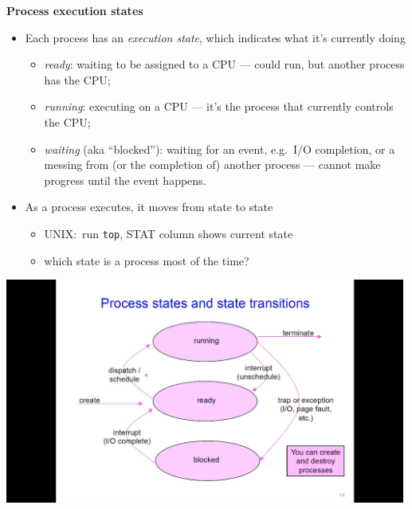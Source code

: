 \documentclass[11pt,a4paper]{article}
\begin{document}
\textbf{Process execution states}
\begin{itemize}
    \item Each process has an \emph{execution state}, which indicates what it's currently doing
        \begin{itemize}
            \item \emph{ready}: waiting to be assigned to a CPU ---
                could run, but another process has the CPU;\
            \item \emph{running}: executing on a CPU ---
                it's the process that currently controls the CPU;\
            \item \emph{waiting} (aka ``blocked''): waiting for an event, e.g.\ I/O completion,
                or a messing from (or the completion of) another process ---
                cannot make progress until the event happens.
        \end{itemize}
    \item As a process executes, it moves from state to state
        \begin{itemize}
            \item UNIX:\ run \texttt{top}, STAT column shows current state
            \item which state is a process most of the time?
        \end{itemize}
\end{itemize}

\includegraphics[height=280]{process-states-and-state-transitions.jpg}
\end{document}

